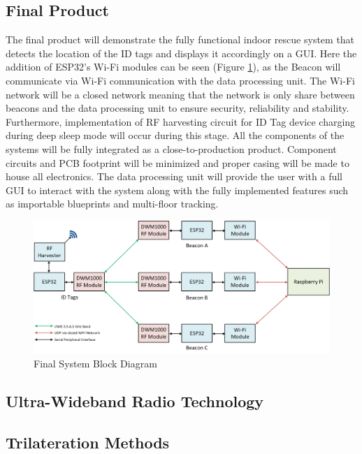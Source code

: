 \subsection{Final Product}
\medskip
The final product will demonstrate the fully functional indoor rescue system that detects the location of the ID tags and displays it accordingly on a GUI. Here the addition of ESP32’s Wi-Fi modules can be seen (Figure \ref{final}), as the Beacon will communicate via Wi-Fi communication with the data processing unit. The Wi-Fi network will be a closed network meaning that the network is only share between beacons and the data processing unit to ensure security, reliability and stability. Furthermore, implementation of RF harvesting circuit for ID Tag device charging during deep sleep mode will occur during this stage. All the components of the systems will be fully integrated as a close-to-production product. Component circuits and PCB footprint will be minimized and proper casing will be made to house all electronics. The data processing unit will provide the user with a full GUI to interact with the system along with the fully implemented features such as importable blueprints and multi-floor tracking.

\medskip
\begin{figure}[H]
\centering
    \includegraphics[width=\linewidth]{./images/03_final.png}
    \caption{Final System Block Diagram}
    \label{final}
\end{figure}




\pagebreak
\subsection{Ultra-Wideband Radio Technology}
\medskip



\pagebreak
\subsection{Trilateration Methods}



